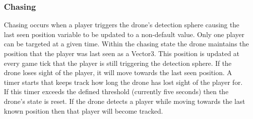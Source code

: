 \documentclass[11pt,a4paper]{article}
\begin{document}
\subsubsection{Chasing}
Chasing occurs when a player triggers the drone's detection sphere causing the last seen position variable to be updated to a non-default value. Only one player can be targeted at a given time. Within the chasing state the drone maintains the position that the player was last seen as a Vector3. This position is updated at every game tick that the player is still triggering the detection sphere. If the drone loses sight of the player, it will move towards the last seen position. A timer starts that keeps track how long the drone has lost sight of the player for. If this timer exceeds the defined threshold (currently five seconds) then the drone's state is reset. If the drone detects a player while moving towards the last known position then that player will become tracked.
\end{document}

